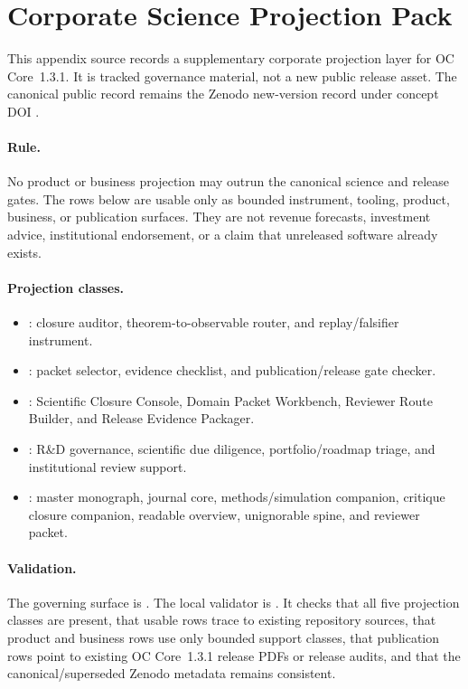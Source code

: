 \section{Corporate Science Projection Pack}
\label{sec:oc-core-1-3-1-corporate-projection-pack}

This appendix source records a supplementary corporate projection layer for
OC Core~1.3.1. It is tracked governance material, not a new public release
asset. The canonical public record remains the Zenodo new-version record
 under concept DOI
.

\paragraph{Rule.}
No product or business projection may outrun the canonical science and release
gates. The rows below are usable only as bounded instrument, tooling, product,
business, or publication surfaces. They are not revenue forecasts, investment
advice, institutional endorsement, or a claim that unreleased software already
exists.

\paragraph{Projection classes.}
\begin{itemize}[leftmargin=1.6em,nosep]
  \item {}: closure auditor, theorem-to-observable router,
        and replay/falsifier instrument.
  \item {}: packet selector, evidence checklist, and
        publication/release gate checker.
  \item {}: Scientific Closure Console, Domain Packet Workbench,
        Reviewer Route Builder, and Release Evidence Packager.
  \item {}: R\&D governance, scientific due diligence,
        portfolio/roadmap triage, and institutional review support.
  \item {}: master monograph, journal core,
        methods/simulation companion, critique closure companion, readable
        overview, unignorable spine, and reviewer packet.
\end{itemize}

\paragraph{Validation.}
The governing surface is
.
The local validator is
. It checks that all
five projection classes are present, that usable rows trace to existing
repository sources, that product and business rows use only bounded support
classes, that publication rows point to existing OC Core~1.3.1 release PDFs or
release audits, and that the canonical/superseded Zenodo metadata remains
consistent.
